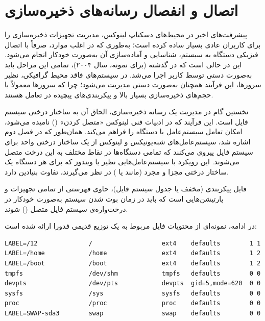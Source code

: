\section{اتصال و انفصال رسانه‌های ذخیره‌سازی}

پیشرفت‌های اخیر در محیط‌های دسکتاپ لینوکس، مدیریت تجهیزات ذخیره‌سازی را برای کاربران عادی بسیار ساده کرده است؛ به‌طوری که در اغلب موارد، صرفاً با اتصال فیزیکی دستگاه به سیستم، شناسایی و آماده‌سازی آن به‌صورت خودکار انجام می‌شود. این در حالی است که در گذشته (برای نمونه، سال ۲۰۰۴)، تمامی این مراحل باید به‌صورت دستی توسط کاربر اجرا می‌شد. در سیستم‌های فاقد محیط گرافیکی، نظیر سرورها، این فرآیند همچنان به‌صورت دستی مدیریت می‌شود؛ چرا که سرورها معمولاً با حجم‌های ذخیره‌سازی بسیار بالا و پیکربندی‌های پیچیده در تعامل هستند.

نخستین گام در مدیریت یک رسانه ذخیره‌سازی، الحاق آن به ساختار درختی سیستم فایل است. این فرآیند که در ادبیات فنی لینوکس «متصل کردن» () نامیده می‌شود، امکان تعامل سیستم‌عامل با دستگاه را فراهم می‌کند. همان‌طور که در فصل دوم اشاره شد، سیستم‌عامل‌های شبه‌یونیکس و لینوکس از یک ساختار درختی واحد برای سیستم فایل پیروی می‌کنند که تمامی دستگاه‌ها در نقاط مختلف به این درخت متصل می‌شوند. این رویکرد با سیستم‌عامل‌هایی نظیر  یا ویندوز که برای هر دستگاه یک ساختار درختی مجزا و مجرد (مانند  یا ) در نظر می‌گیرند، تفاوت بنیادین دارد.

فایل پیکربندی  (مخفف  یا جدول سیستم فایل)، حاوی فهرستی از تمامی تجهیزات و پارتیشن‌هایی است که باید در زمان بوت شدن سیستم به‌صورت خودکار در درخت‌واره‌ی سیستم فایل متصل () شوند.

در ادامه، نمونه‌ای از محتویات فایل  مربوط به یک توزیع قدیمی فدورا ارائه شده است:

\begin{latin}
\begin{lstlisting}
LABEL=/12              /                   ext4    defaults        1 1
LABEL=/home            /home               ext4    defaults        1 2
LABEL=/boot            /boot               ext4    defaults        1 2
tmpfs                  /dev/shm            tmpfs   defaults        0 0
devpts                 /dev/pts            devpts  gid=5,mode=620  0 0
sysfs                  /sys                sysfs   defaults        0 0
proc                   /proc               proc    defaults        0 0
LABEL=SWAP-sda3        swap                swap    defaults        0 0
\end{lstlisting}
\end{latin}

